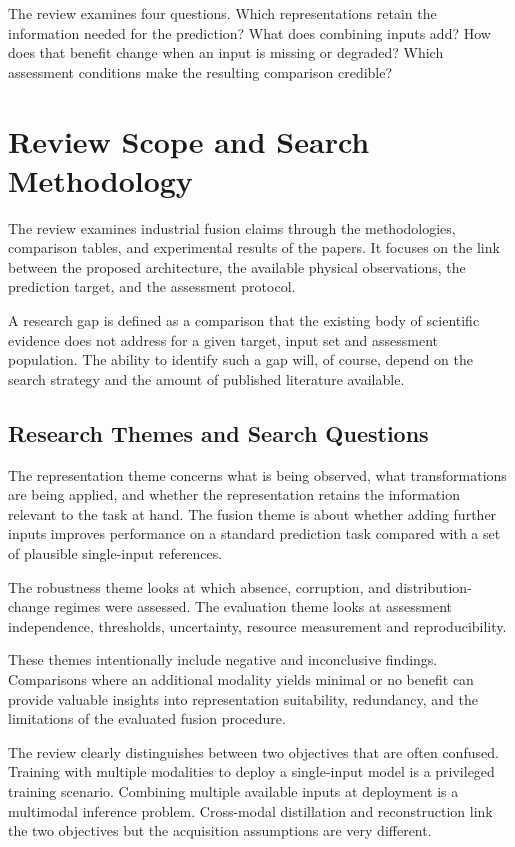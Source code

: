 The review examines four questions. Which representations retain the information needed for the prediction? What does combining inputs add? How does that benefit change when an input is missing or degraded? Which assessment conditions make the resulting comparison credible?

\section{Review Scope and Search Methodology}

The review examines industrial fusion claims through the methodologies, comparison tables, and
experimental results of the papers. It focuses on the link between the proposed architecture, the
available physical observations, the prediction target, and the assessment protocol.

A research gap is defined as a comparison that the existing body of scientific evidence does not
address for a given target, input set and assessment population. The ability to identify such a gap
will, of course, depend on the search strategy and the amount of published literature available.

\subsection{Research Themes and Search Questions}

The representation theme concerns what is being observed, what transformations are being applied,
and whether the representation retains the information relevant to the task at hand. The fusion
theme is about whether adding further inputs improves performance on a standard prediction task
compared with a set of plausible single-input references.

The robustness theme looks at which absence, corruption, and distribution-change regimes were
assessed. The evaluation theme looks at assessment independence, thresholds, uncertainty, resource
measurement and reproducibility.

These themes intentionally include negative and inconclusive findings. Comparisons where an
additional modality yields minimal or no benefit can provide valuable insights into representation
suitability, redundancy, and the limitations of the evaluated fusion procedure.

The review clearly distinguishes between two objectives that are often confused. Training with
multiple modalities to deploy a single-input model is a privileged training scenario. Combining
multiple available inputs at deployment is a multimodal inference problem. Cross-modal distillation
and reconstruction link the two objectives but the acquisition assumptions are very different.

